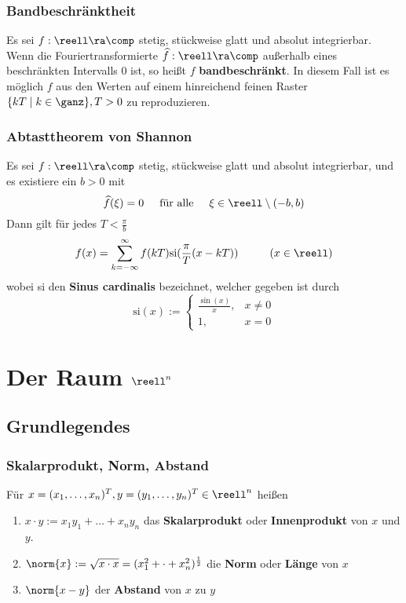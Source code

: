 \documentclass{kit}
\begin{document}
    \subsubsection{Bandbeschränktheit}
      Es sei $f:\reell\ra\comp$ stetig, stückweise glatt und absolut integrierbar. Wenn die Fouriertransformierte 
      $\widehat f:\reell\ra\comp$ außerhalb eines beschränkten Intervalls 0 ist, so heißt $f$ \textbf{bandbeschränkt}.
      In diesem Fall ist es möglich $f$ aus den Werten auf einem hinreichend feinen Raster $\{kT\mid k\in\ganz\},T>0$ zu
      reproduzieren.
    \subsubsection{Abtasttheorem von Shannon}
      Es sei $f:\reell\ra\comp$ stetig, stückweise glatt und absolut integrierbar, und es existiere ein $b>0$ mit
      $$\widehat f(\xi)=0\hspace{0.5cm}\text{für alle}\hspace{0.5cm}\xi\in\reell\setminus(-b,b)$$
      Dann gilt für jedes $T<\frac{\pi}{b}$
      $$f(x)=\sum^\infty_{k=-\infty}f(kT)\text{si}(\frac{\pi}{T}(x-kT))\hspace{1cm}(x\in\reell)$$
      wobei si den \textbf{Sinus cardinalis} bezeichnet, welcher gegeben ist durch
      $$\text{si}(x):=\begin{cases}
        \frac{\sin(x)}{x}, & x\neq0\\
        1, & x=0
      \end{cases}$$
\section{Der Raum \texorpdfstring{$\reell^n$}{}}
  \subsection{Grundlegendes}
    \subsubsection{Skalarprodukt, Norm, Abstand}
      Für $x=(x_1,\dots,x_n)^T,y=(y_1,\dots,y_n)^T\in\reell^n$ heißen
      \begin{enumerate}
        \item $x\cdot y:=x_1y_1+\dots+x_ny_n$ das \textbf{Skalarprodukt} oder \textbf{Innenprodukt} von $x$ und $y$.
        \item $\norm{x}:=\sqrt{x\cdot x}=(x^2_1+\cdot+x_n^2)^\frac{1}{2}$ die \textbf{Norm} oder \textbf{Länge} von $x$
        \item $\norm{x-y}$ der \textbf{Abstand} von $x$ zu $y$
      \end{enumerate}
\end{document}
